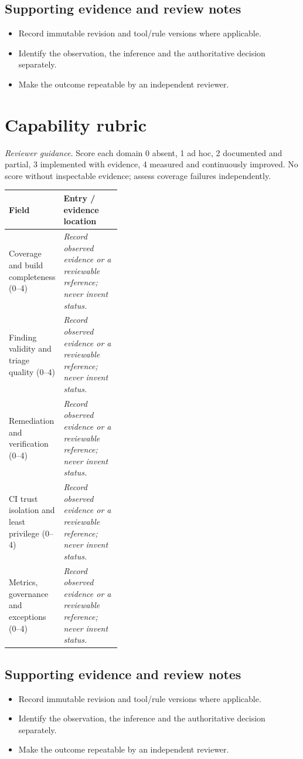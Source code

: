 \documentclass[10pt,letterpaper]{article}
\begin{document}
\subsection{Supporting evidence and review notes}
\begin{itemize}
\item Record immutable revision and tool/rule versions where applicable.
\item Identify the observation, the inference and the authoritative decision separately.
\item Make the outcome repeatable by an independent reviewer.
\end{itemize}
\clearpage
\section{Capability rubric}
\textit{Reviewer guidance.} Score each domain 0 absent, 1 ad hoc, 2 documented and partial, 3 implemented with evidence, 4 measured and continuously improved. No score without inspectable evidence; assess coverage failures independently.
\begin{tabularx}{\linewidth}{@{}p{0.38\linewidth}Y@{}}
\toprule Field & Entry / evidence location\\\midrule
Coverage and build completeness (0--4) & \textit{Record observed evidence or a reviewable reference; never invent status.}\\[1.0em]
\midrule
Finding validity and triage quality (0--4) & \textit{Record observed evidence or a reviewable reference; never invent status.}\\[1.0em]
\midrule
Remediation and verification (0--4) & \textit{Record observed evidence or a reviewable reference; never invent status.}\\[1.0em]
\midrule
CI trust isolation and least privilege (0--4) & \textit{Record observed evidence or a reviewable reference; never invent status.}\\[1.0em]
\midrule
Metrics, governance and exceptions (0--4) & \textit{Record observed evidence or a reviewable reference; never invent status.}\\[1.0em]
\midrule
\end{tabularx}
\subsection{Supporting evidence and review notes}
\begin{itemize}
\item Record immutable revision and tool/rule versions where applicable.
\item Identify the observation, the inference and the authoritative decision separately.
\item Make the outcome repeatable by an independent reviewer.
\end{itemize}
\clearpage
\end{document}
